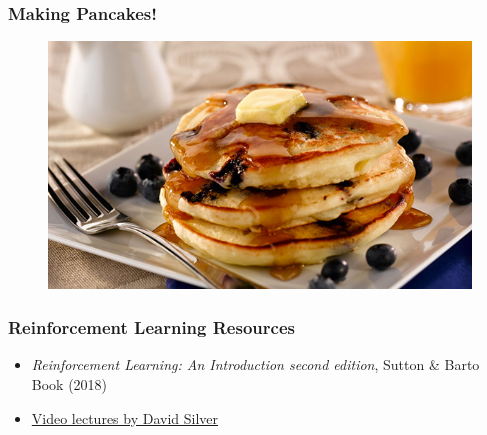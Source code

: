\documentclass{beamer}
\begin{document}
\begin{frame}\frametitle{Making Pancakes!}\small
\begin{figure}
\href{run:videos/lecture19/pancakes.mp4}{
\includegraphics[width=0.9\linewidth]{Figures/pancakes1}\\
{}
}
\end{figure}
\end{frame}


\begin{frame}\frametitle{Reinforcement Learning Resources}\small
\begin{itemize}

\item {\it Reinforcement Learning: An Introduction second edition}, Sutton \& Barto Book (2018)
\item  \href{https://www.youtube.com/watch?v=2pWv7GOvuf0}{Video lectures by David Silver}
\end{itemize}
\end{frame}

% 
\end{document}

